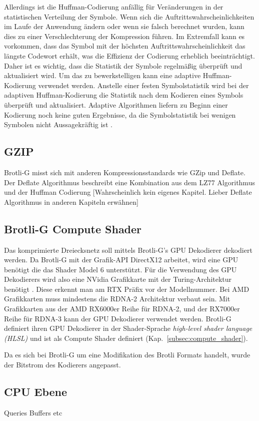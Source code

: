 Allerdings ist die Huffman-Codierung anfällig für Veränderungen in der statistischen Verteilung der Symbole. Wenn sich die Auftrittswahrscheinlichkeiten im Laufe der Anwendung ändern oder wenn sie falsch berechnet wurden, kann dies zu einer Verschlechterung der Kompression führen. Im Extremfall kann es vorkommen, dass das Symbol mit der höchsten Auftrittswahrscheinlichkeit das längste Codewort erhält, was die Effizienz der Codierung erheblich beeinträchtigt. Daher ist es wichtig, dass die Statistik der Symbole regelmäßig überprüft und aktualisiert wird.
Um das zu bewerkstelligen kann eine adaptive Huffman-Kodierung verwendet werden. Anstelle einer festen Symbolstatistik wird bei der adaptiven Huffman-Kodierung die Statistik nach dem Kodieren eines Symbols überprüft und aktualisiert. Adaptive Algorithmen liefern zu Beginn einer Kodierung noch keine guten Ergebnisse, da die Symbolstatistik bei wenigen Symbolen nicht Aussagekräftig ist \cite{Jeon1998}. 

\subsection{GZIP}
\label{subsec:gzip}
Brotli-G misst sich mit anderen Kompressionsstandards wie GZip und Deflate.
Der Deflate Algorithmus beschreibt eine Kombination aus dem LZ77 Algorithmus und der Huffman Codierung
[Wahrscheinlich kein eigenes Kapitel. Lieber Deflate Algorithmus in anderen Kapiteln erwähnen]

\subsection{Brotli-G Compute Shader}
\label{subsec:brotlig_compute}
Das komprimierte Dreiecksnetz soll mittels Brotli-G's GPU Dekodierer dekodiert werden.
Da Brotli-G mit der Grafik-API DirectX12 arbeitet, wird eine GPU benötigt die das Shader Model 6 unterstützt.
Für die Verwendung des GPU Dekodierers wird also eine NVidia Grafikkarte mit der Turing-Architektur benötigt \cite{Burgess2020}.
Diese erkennt man am RTX Präfix vor der Modellnummer.
Bei AMD Grafikkarten muss mindestens die RDNA-2 Architektur verbaut sein.
Mit Grafikkarten aus der AMD RX6000er Reihe für RDNA-2, und der RX7000er Reihe für RDNA-3 kann der GPU Dekodierer verwendet werden.
Brotli-G definiert ihren GPU Dekodierer in der Shader-Sprache \textit{high-level shader language (HLSL)} und ist als Compute Shader definiert (Kap.~\ref{subsec:compute_shader}). \newline

Da es sich bei Brotli-G um eine Modifikation des Brotli Formats handelt, wurde der Bitstrom des Kodierers angepasst.


\subsection{CPU Ebene}
\label{subsec:brotlig_cpu}
Queries Buffers etc
